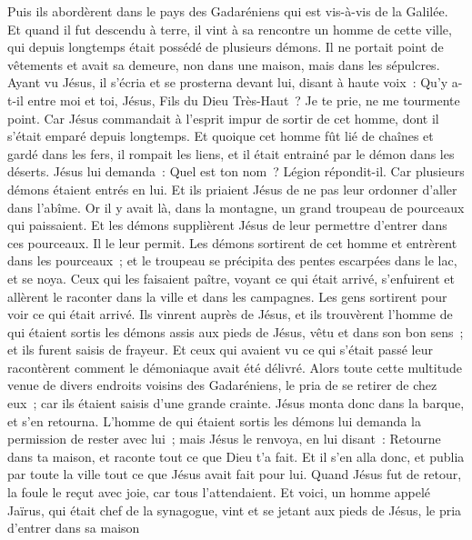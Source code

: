 \begin{multicols}{2}
Puis ils abordèrent dans le pays des Gadaréniens qui est vis-à-vis de la Galilée.
Et quand il fut descendu à terre, il vint à sa rencontre un homme de cette ville, qui depuis longtemps était possédé de plusieurs démons. Il ne portait point de vêtements et avait sa demeure, non dans une maison, mais dans les sépulcres.
Ayant vu Jésus, il s'écria et se prosterna devant lui, disant à haute voix~: Qu'y a-t-il entre moi et toi, Jésus, Fils du Dieu Très-Haut~? Je te prie, ne me tourmente point.
Car Jésus commandait à l'esprit impur de sortir de cet homme, dont il s'était emparé depuis longtemps. Et quoique cet homme fût lié de chaînes et gardé dans les fers, il rompait les liens, et il était entrainé par le démon dans les déserts.
Jésus lui demanda~: Quel est ton nom~? Légion répondit-il. Car plusieurs démons étaient entrés en lui.
Et ils priaient Jésus de ne pas leur ordonner d'aller dans l'abîme.
Or il y avait là, dans la montagne, un grand troupeau de pourceaux qui paissaient. Et les démons supplièrent Jésus de leur permettre d'entrer dans ces pourceaux. Il le leur permit.
Les démons sortirent de cet homme et entrèrent dans les pourceaux~; et le troupeau se précipita des pentes escarpées dans le lac, et se noya.
Ceux qui les faisaient paître, voyant ce qui était arrivé, s'enfuirent et allèrent le raconter dans la ville et dans les campagnes.
Les gens sortirent pour voir ce qui était arrivé. Ils vinrent auprès de Jésus, et ils trouvèrent l'homme de qui étaient sortis les démons assis aux pieds de Jésus, vêtu et dans son bon sens~; et ils furent saisis de frayeur.
Et ceux qui avaient vu ce qui s'était passé leur racontèrent comment le démoniaque avait été délivré.
Alors toute cette multitude venue de divers endroits voisins des Gadaréniens, le pria de se retirer de chez eux~; car ils étaient saisis d'une grande crainte. Jésus monta donc dans la barque, et s'en retourna.
L'homme de qui étaient sortis les démons lui demanda la permission de rester avec lui~; mais Jésus le renvoya, en lui disant~:
Retourne dans ta maison, et raconte tout ce que Dieu t'a fait. Et il s'en alla donc, et publia par toute la ville tout ce que Jésus avait fait pour lui.
Quand Jésus fut de retour, la foule le reçut avec joie, car tous l'attendaient.
Et voici, un homme appelé Jaïrus, qui était chef de la synagogue, vint et se jetant aux pieds de Jésus, le pria d'entrer dans sa maison

\end{multicols}

